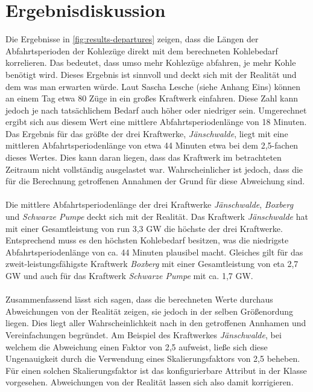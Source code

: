 \section{Ergebnisdiskussion}

Die Ergebnisse in \autoref{fig:results-departures} zeigen, dass die Längen der Abfahrtsperioden der Kohlezüge direkt mit dem berechneten Kohlebedarf korrelieren. Das bedeutet, dass umso mehr Kohlezüge abfahren, je mehr Kohle benötigt wird. Dieses Ergebnis ist sinnvoll und deckt sich mit der Realität und dem was man erwarten würde. Laut Sascha Lesche (siehe Anhang Eins) können an einem Tag etwa 80 Züge in ein großes Kraftwerk einfahren. Diese Zahl kann jedoch je nach tatsächlichem Bedarf auch höher oder niedriger sein. Umgerechnet ergibt sich aus diesem Wert eine mittlere Abfahrtsperiodenlänge von 18 Minuten. Das Ergebnis für das größte der drei Kraftwerke, \emph{Jänschwalde}, liegt mit eine mittleren Abfahrtsperiodenlänge von etwa 44 Minuten etwa bei dem 2,5-fachen dieses Wertes. Dies kann daran liegen, dass das Kraftwerk im betrachteten Zeitraum nicht vollständig ausgelastet war. Wahrscheinlicher ist jedoch, dass die für die Berechnung getroffenen Annahmen der Grund für diese Abweichung sind.\\
\\
Die mittlere Abfahrtsperiodenlänge der drei Kraftwerke \emph{Jänschwalde}, \emph{Boxberg} und \emph{Schwarze Pumpe} deckt sich mit der Realität. Das Kraftwerk \emph{Jänschwalde} hat mit einer Gesamtleistung von run 3,3 GW die höchste der drei Kraftwerke. Entsprechend muss es den höchsten Kohlebedarf besitzen, was die niedrigste Abfahrtsperiodenlänge von ca. 44 Minuten plausibel macht. Gleiches gilt für das zweit-leistungsfähigste Kraftwerk \emph{Boxberg} mit einer Gesamtleistung von eta 2,7 GW und auch für das Kraftwerk \emph{Schwarze Pumpe} mit ca. 1,7 GW. \cite{noauthor_bundesnetzagentur_nodate}\\
\\
Zusammenfassend lässt sich sagen, dass die berechneten Werte durchaus Abweichungen von der Realität zeigen, sie jedoch in der selben Größenordung liegen. Dies liegt aller Wahrscheinlichkeit nach in den getroffenen Annhamen und Vereinfachungen begründet. Am Beispiel des Kraftwerkes \emph{Jänschwalde}, bei welchem die Abweichung einen Faktor von 2,5 aufweist, ließe sich diese Ungenauigkeit durch die Verwendung eines Skalierungsfaktors von 2,5 beheben. Für einen solchen Skalierungsfaktor ist das konfigurierbare Attribut  in der Klasse  vorgesehen. Abweichungen von der Realität lassen sich also damit korrigieren.